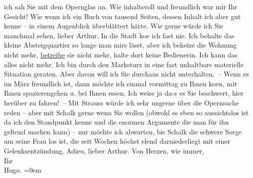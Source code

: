 \begin{ledgroupsized}[t]{13cm}
                    ich sah Sie mit dem Opernglas an. Wie inhaltsvoll und freundlich war mir Ihr
                    Gesicht! Wie wenn ich ein Buch von tausend Seiten, dessen Inhalt ich aber gut
                    kenne – in einem Augenblick überblättert hätte.\pend
           \pstart
           Wie gerne würde ich Sie manchmal sehen, lieber Arthur. In die Stadt ko{\geminationm}e ich fast nie. Ich behalte das kleine
                    Absteigquartier so lange man mirs lässt, aber ich beheize die Wohnung nicht
                    mehr, \uline{betreibe} sie nicht mehr, halte dort keine
                    Bedienerin. Ich kann das alles nicht mehr. Ich bin durch den Marksturz in eine
                    fast unhaltbare materielle Situation geraten. Aber davon will {\pb}ich Sie durchaus nicht
                    unterhalten. – Wenn es im März freundlich ist, dann möchte ich
                    einmal vormittag zu Ihnen ko{\geminationm}en, mit Ihnen
                    spazierengehen u. bei Ihnen essen. Ich weiss ja da\textcolor{gray}{s}s es Sie beschwert, hier
                    herüber zu fahren! –\pend
           \pstart
           Mit Strauss würde ich sehr ungerne über die
                        Opernsache reden – aber
                    mit Schalk gerne wenn Sie wollen (obwohl es
                    eben so aussichtslos ist da ich den Standpunkt kenne und die enormen Argumente
                    die man für ihn geltend machen kann) – nur möchte ich abwarten, bis Schalk die schwere Sorge um seine Frau los ist, die seit
                    Wochen höchst elend darniederliegt mit einer Gelenksentzündung.\pend
           \pstart
           Adieu, lieber Arthur.\pend
           \pstart
           Von Herzen, wie immer,{\\[\baselineskip]}Ihr{\\[\baselineskip]}\spacefill\mbox{Hugo.}\pend
           \leftskip=0em{}
         
         \endnumbering{}\end{ledgroupsized}  \newcommand{\dateiname}{L02396}\newcommand{\titel}{Hugo Hofmannsthal an Arthur Schnitzler, 16. 1. 1923}\newcommand{\editorInnen}{Martin Anton Müller und Gerd-Hermann Susen}
      